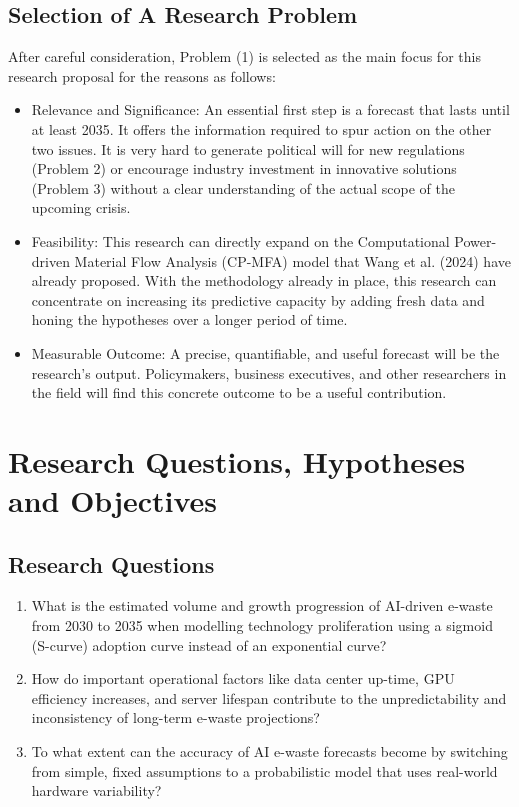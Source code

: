 \documentclass[a4paper, 12pt]{article}
\begin{document}
\subsection*{Selection of A Research Problem}
After careful consideration, Problem (1) is selected as the main focus for this research proposal for the reasons as follows: 

\begin{itemize}
	\item Relevance and Significance: An essential first step is a forecast that lasts until at least 2035. It offers the information required to spur action on the other two issues. It is very hard to generate political will for new regulations (Problem 2) or encourage industry investment in innovative solutions (Problem 3) without a clear understanding of the actual scope of the upcoming crisis.
	
	\item Feasibility: This research can directly expand on the Computational Power-driven Material Flow Analysis (CP-MFA) model that Wang et al. (2024) have already proposed. With the methodology already in place, this research can concentrate on increasing its predictive capacity by adding fresh data and honing the hypotheses over a longer period of time.
	
	\item Measurable Outcome: A precise, quantifiable, and useful forecast will be the research's output.  Policymakers, business executives, and other researchers in the field will find this concrete outcome to be a useful contribution.
\end{itemize}

\section{Research Questions, Hypotheses and Objectives}
\subsection*{Research Questions}
\begin{enumerate}
	\item What is the estimated volume and growth progression of AI-driven e-waste from 2030 to 2035 when modelling technology proliferation using a sigmoid (S-curve) adoption curve instead of an exponential curve?
	\item How do important operational factors like data center up-time, GPU efficiency increases, and server lifespan contribute to the unpredictability and inconsistency of long-term e-waste projections?
	\item To what extent can the accuracy of AI e-waste forecasts become by switching from simple, fixed assumptions to a probabilistic model that uses real-world hardware variability?
\end{enumerate}
\end{document}
